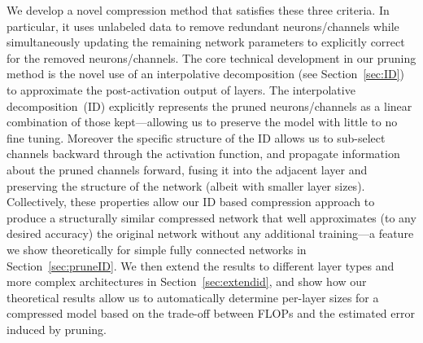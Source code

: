 We develop a novel compression method that satisfies these three criteria. In particular, it uses unlabeled data to remove redundant neurons/channels while simultaneously updating the remaining network parameters to explicitly correct for the removed neurons/channels. 
The core technical development in our pruning method is the novel use of an
interpolative decomposition (see Section~\ref{sec:ID}) to approximate the post-activation output of layers.
The interpolative decomposition~(ID)
explicitly represents 
the pruned neurons/channels as a linear combination of those kept---allowing us to preserve the model with little to no fine tuning.
Moreover the specific structure of the ID allows us to sub-select channels backward through the activation function, and propagate information about the pruned channels forward, fusing it into the adjacent layer and preserving the structure of the network (albeit with smaller layer sizes).
Collectively, these properties allow our ID based compression approach to produce a structurally similar compressed network that well approximates (to any desired accuracy) the original network without any additional training---a feature we show theoretically for simple fully connected networks in Section~\ref{sec:pruneID}. We then extend the results to different layer types and more complex architectures in Section~\ref{sec:extendid}, and show how our theoretical results allow us to automatically determine per-layer sizes for a compressed model based on the trade-off between FLOPs and the estimated error induced by pruning.

